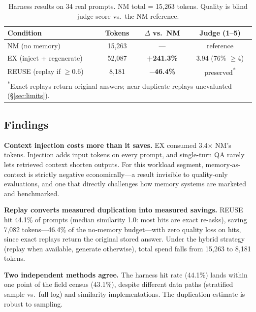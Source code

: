 \documentclass{article}
\begin{document}
\begin{table}[t]
\centering
\caption{Harness results on 34 real prompts. NM total = 15{,}263 tokens.
Quality is blind judge score vs.\ the NM reference.}
\label{tab:harness}
\begin{tabular}{lccc}
\toprule
Condition & Tokens & $\Delta$ vs.\ NM & Judge (1--5) \\
\midrule
NM (no memory) & 15{,}263 & --- & reference \\
EX (inject + regenerate) & 52{,}087 & \textbf{+241.3\%} & 3.94 (76\% $\geq$4) \\
REUSE (replay if $\geq0.6$) & 8{,}181 & \textbf{$-$46.4\%} & preserved\textsuperscript{*} \\
\bottomrule
\multicolumn{4}{l}{\small \textsuperscript{*}Exact replays return original
answers; near-duplicate replays unevaluated (\S\ref{sec:limits}).}\\
\end{tabular}
\end{table}

\subsection{Findings}
\label{sec:findings}
\textbf{Context injection costs more than it saves.} EX consumed 3.4$\times$
NM's tokens. Injection adds input tokens on every prompt, and single-turn
QA rarely lets retrieved context shorten outputs. For this workload segment,
memory-as-context is strictly negative economically---a result invisible to
quality-only evaluations, and one that directly challenges how memory
systems are marketed and benchmarked.

\textbf{Replay converts measured duplication into measured savings.} REUSE
hit 44.1\% of prompts (median similarity 1.0: most hits are exact re-asks),
saving 7{,}082 tokens---46.4\% of the no-memory budget---with zero quality
loss on hits, since exact replays return the original stored answer. Under
the hybrid strategy (replay when available, generate otherwise), total spend
falls from 15{,}263 to 8{,}181 tokens.

\textbf{Two independent methods agree.} The harness hit rate (44.1\%) lands
within one point of the field census (43.1\%), despite different data paths
(stratified sample vs.\ full log) and similarity implementations. The
duplication estimate is robust to sampling.
\end{document}
